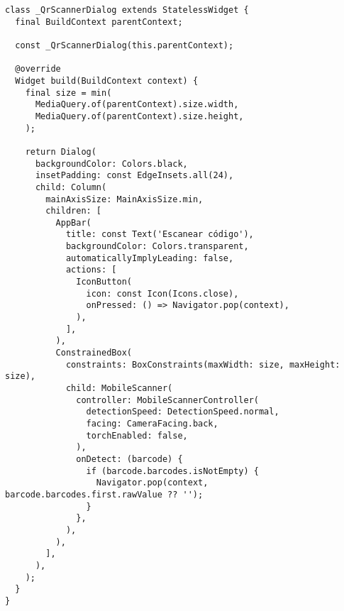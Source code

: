 \begin{verbatim}
class _QrScannerDialog extends StatelessWidget {
  final BuildContext parentContext;

  const _QrScannerDialog(this.parentContext);

  @override
  Widget build(BuildContext context) {
    final size = min(
      MediaQuery.of(parentContext).size.width,
      MediaQuery.of(parentContext).size.height,
    );

    return Dialog(
      backgroundColor: Colors.black,
      insetPadding: const EdgeInsets.all(24),
      child: Column(
        mainAxisSize: MainAxisSize.min,
        children: [
          AppBar(
            title: const Text('Escanear código'),
            backgroundColor: Colors.transparent,
            automaticallyImplyLeading: false,
            actions: [
              IconButton(
                icon: const Icon(Icons.close),
                onPressed: () => Navigator.pop(context),
              ),
            ],
          ),
          ConstrainedBox(
            constraints: BoxConstraints(maxWidth: size, maxHeight: size),
            child: MobileScanner(
              controller: MobileScannerController(
                detectionSpeed: DetectionSpeed.normal,
                facing: CameraFacing.back,
                torchEnabled: false,
              ),
              onDetect: (barcode) {
                if (barcode.barcodes.isNotEmpty) {
                  Navigator.pop(context, barcode.barcodes.first.rawValue ?? '');
                }
              },
            ),
          ),
        ],
      ),
    );
  }
}
\end{verbatim}










